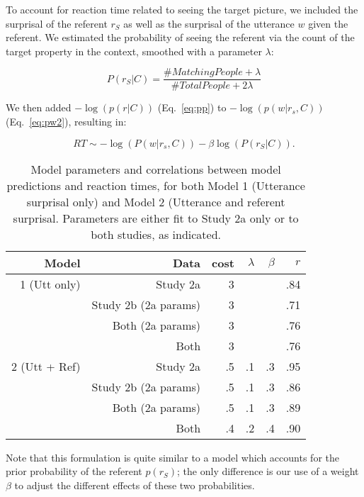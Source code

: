 \documentclass[man]{apa2}
\begin{document}
To account for reaction time related to seeing the target picture, we included the surprisal of the referent $r_S$ as well as the surprisal of the utterance $w$ given the referent. We estimated the probability of seeing the referent via the count of the target property in the context, smoothed with a parameter $\lambda$:

\begin{equation}\label{eq:pp}
P(r_S | C) =  \frac{\# Matching People  + \lambda}{\# Total People + 2\lambda}
\end{equation}

We then added $-\log(p(r|C))$ (Eq.\ \ref{eq:pp}) to $-\log(p(w|r_s,C))$ (Eq.\ \ref{eq:pw2}), resulting in:

\begin{equation}\label{eq:total}
RT \sim - \log(P(w|r_s, C)) - \beta \log(P(r_S|C)).
\end{equation}

\begin{table}[t]
\caption{\label{tab:modelcorrs} Model parameters and correlations between model predictions and reaction times, for both Model 1 (Utterance surprisal only) and Model 2 (Utterance and referent surprisal.  Parameters are either fit to Study 2a only or to both studies, as indicated.}
\begin{center}
\small\addtolength{\tabcolsep}{-2pt}
\begin{tabular}{ r| r|  r  r  r  r} 
  \bf{Model} & \bf{Data} & \bf{cost} & \bf{$\lambda$} & \bf{$\beta$} & \bf{$r$}  \\ \hline        
1 (Utt only) &  Study 2a  & 3 & & & .84\\     
& Study 2b (2a params) & 3  & & & .71\\
  & Both (2a params) &  3 & &  & .76 \\
  & Both & 3 &   &   & .76 \\ \hline
2 (Utt + Ref)  & Study 2a & .5 & .1 & .3 & .95\\     
& Study 2b (2a params) & .5  & .1 & .3 & .86\\
  & Both (2a params) &  .5 & .1 & .3 & .89\\
  & Both & .4 &   .2 &  .4 & .90\\ 
\hline
\end{tabular}
\end{center}
\end{table}

\noindent Note that this formulation is quite similar to a model which accounts for the prior probability of the referent $p(r_S)$; the only difference is our use of a weight $\beta$ to adjust the different effects of these two probabilities.  
\end{document}
